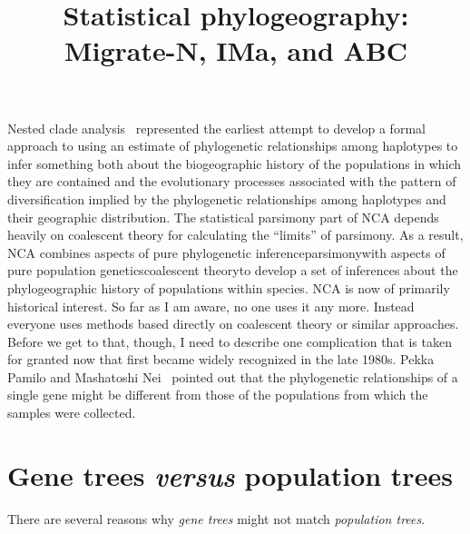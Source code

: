 \documentclass[12pt]{article}
\title{Statistical phylogeography: Migrate-N, IMa, and ABC}
\begin{document}
\maketitle

\thispagestyle{first}

Nested clade
analysis~\cite{Templeton-2004,Templeton-2009,Templeton-etal-1995}
represented the earliest attempt to develop a formal approach to using
an estimate of phylogenetic relationships among haplotypes to infer
something both about the biogeographic history of the populations in
which they are contained and the evolutionary processes associated
with the pattern of diversification implied by the phylogenetic
relationships among haplotypes and their geographic distribution. The
statistical parsimony part of NCA depends heavily on coalescent theory
for calculating the ``limits'' of parsimony. As a result, NCA combines
aspects of pure phylogenetic inference{\dash}parsimony{\dash}with
aspects of pure population genetics{\dash}coalescent theory{\dash}to
develop a set of inferences about the phylogeographic history of
populations within species. NCA is now of primarily historical
interest. So far as I am aware, no one uses it any more. Instead
everyone uses methods based directly on coalescent theory or similar
approaches. Before we get to that, though, I need to describe one
complication that is taken for granted now that first became widely
recognized in the late 1980s. Pekka Pamilo and Mashatoshi
Nei~\cite{Pamilo-Nei-1988} pointed out that the phylogenetic
relationships of a single gene might be different from those of the
populations from which the samples were collected.

\section*{Gene trees {\it versus\/} population trees}

There are several reasons why {\it gene trees\/} might not match {\it
  population trees}.
\end{document}
